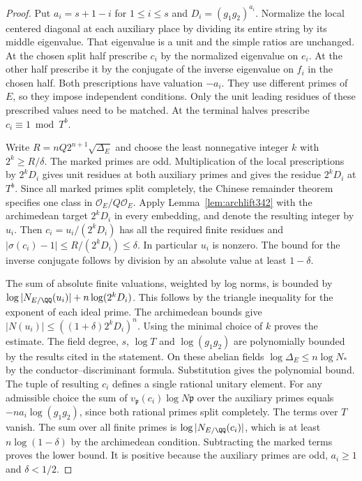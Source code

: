 \documentclass[a4paper,11pt]{article}
\theoremstyle{definition}
\theoremstyle{remark}
\numberwithin{equation}{section}
\begin{document}
\begin{proof}
Put $a_i=s+1-i$ for $1\le i\le s$ and $D_i=(g_1g_2)^{a_i}$.
Normalize the local centered diagonal at each auxiliary place by
dividing its entire string by its middle eigenvalue. That eigenvalue
is a unit and the simple ratios are unchanged. At the chosen split
half prescribe $c_i$ by the normalized eigenvalue on $e_i$. At the
other half prescribe it by the conjugate of the inverse eigenvalue
on $f_i$ in the chosen half. Both prescriptions have valuation
$-a_i$. They use different primes of $E$, so they impose independent
conditions. Only the unit leading residues of these prescribed
values need to be matched. At the terminal halves prescribe
$c_i\equiv1\bmod T^b$.

Write $R=nQ2^{n+1}\sqrt{\Delta_E}$ and choose the least nonnegative
integer $k$ with $2^k\ge R/\delta$. The marked primes are odd.
Multiplication of the local prescriptions by $2^kD_i$ gives unit
residues at both auxiliary primes and gives the residue $2^kD_i$
at $T^b$. Since all marked primes split completely, the Chinese
remainder theorem specifies one class in $\mathcal O_E/Q\mathcal O_E$.
Apply Lemma~\ref{lem:archlift342} with the archimedean target
$2^kD_i$ in every embedding, and denote the resulting integer by
$u_i$. Then $c_i=u_i/(2^kD_i)$ has all the required finite residues
and $|\sigma(c_i)-1|\le R/(2^kD_i)\le\delta$. In particular $u_i$
is nonzero. The bound for the inverse conjugate follows by division
by an absolute value at least $1-\delta$.

The sum of absolute finite valuations, weighted by log norms, is
bounded by $\log|N_{E/\QQ}(u_i)|+n\log(2^kD_i)$. This follows by
the triangle inequality for the exponent of each ideal prime.
The archimedean bounds give $|N(u_i)|\le((1+\delta)2^kD_i)^n$.
Using the minimal choice of $k$ proves the estimate. The field
degree, $s$, $\log T$ and $\log(g_1g_2)$ are polynomially bounded
by the results cited in the statement. On these abelian fields
$\log\Delta_E\le n\log N_*$ by the conductor--discriminant formula.
Substitution gives the polynomial bound. The tuple of resulting
$c_i$ defines a single rational unitary element. For any admissible
choice the sum of $v_{\mathfrak p}(c_i)\log N\mathfrak p$ over the
auxiliary primes equals $-na_i\log(g_1g_2)$, since both rational
primes split completely. The terms over $T$ vanish. The sum over
all finite primes is $\log|N_{E/\QQ}(c_i)|$, which is at least
$n\log(1-\delta)$ by the archimedean condition. Subtracting the
marked terms proves the lower bound. It is positive because the
auxiliary primes are odd, $a_i\ge1$ and $\delta<1/2$.
\end{proof}
\end{document}
